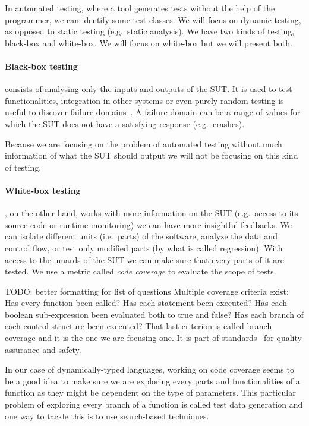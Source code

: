 \documentclass{llncs2e/llncs}
\makeatletter
\def\todo#1{{\color{red}TODO\@: #1}}
\makeatother
\begin{document}
In automated testing, where a tool generates tests without the help of the
programmer, we can identify some test classes. We will focus on dynamic testing,
as opposed to static testing (e.g.\ static analysis). We have two kinds of
testing, black-box and white-box. We will focus on white-box but we will present
both.

\paragraph{Black-box testing} consists of analysing only the inputs and
outputs of the SUT\@. It is used to test functionalities, integration in other
systems or even purely random testing is useful to discover failure
domains~\cite{ahmad2014new}. A failure domain can be a range of values for which
the SUT does not have a satisfying response (e.g.\ crashes).

Because we are focusing on the problem of automated testing without much
information of what the SUT should output we will not be focusing on this kind
of testing.

\paragraph{White-box testing}, on the other hand, works with more information on
the SUT (e.g.\ access to its source code or runtime monitoring) we can have more
insightful feedbacks. We can isolate different units (i.e.\ parts) of the
software, analyze the data and control flow, or test only modified parts (by
what is called regression).  With access to the innards of the SUT we can make
sure that every parts of it are tested. We use a metric called \textit{code
coverage} to evaluate the scope of tests.

\todo{better formatting for list of questions}
Multiple coverage criteria exist: Has every function been called? Has each
statement been executed? Has each boolean sub-expression been evaluated both to
true and false? Has each branch of each control structure been executed? That
last criterion is called branch coverage and it is the one we are focusing one.
It is part of standards~\cite{BSI98,RTCA92} for quality assurance and safety.

In our case of dynamically-typed languages, working on code coverage seems to be
a good idea to make sure we are exploring every parts and functionalities of a
function as they might be dependent on the type of parameters. This particular
problem of exploring every branch of a function is called test data generation
and one way to tackle this is to use search-based techniques.
\end{document}
